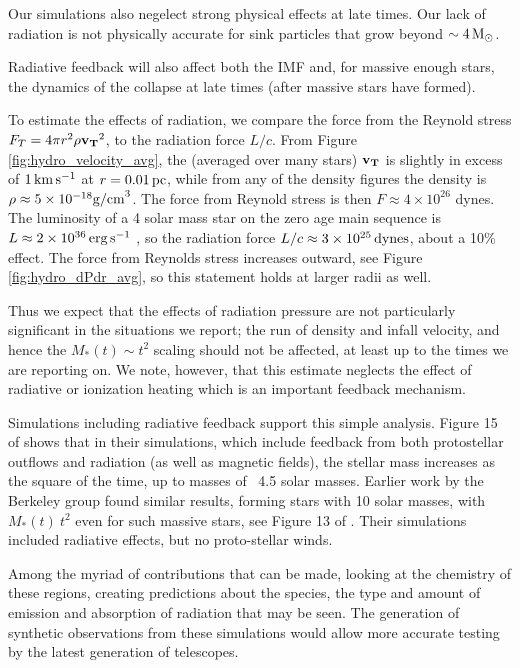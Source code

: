 \documentclass[../dissertation.tex]{subfiles}
\begin{document}
Our simulations also negelect strong physical effects at late times. 
Our lack of radiation is not physically accurate for sink particles that grow beyond $\sim 4 {\,\rm M}_\odot$.

Radiative feedback will also affect both the IMF and, for massive enough stars, the dynamics of the collapse at late times (after massive stars have formed). 

To estimate the effects of radiation, we compare the force from the Reynold stress $F_T=4\pi r^2 \rho \mathbf{v_T}^2$, to the radiation force $L/c$. 
From Figure \ref{fig:hydro_velocity_avg}, the (averaged over many stars) $\mathbf{v_T}$ is slightly in excess of $1\,\rm km\,s^{-1}$ at $r=0.01\,\rm pc$, 
while from any of the density figures the density is $\rho\approx5\times10^{-18} {\rm g/cm}^3$. 
The force from Reynold stress is then $F\approx4\times 10^{26}$ dynes. 
The luminosity of a 4 solar mass star on the zero age main sequence is $L\approx 2\times10^{36}\,\rm erg\, s^{-1}$ \citep{1992A&AS...96..269S}, 
so the radiation force $L/c \approx 3\times10^{25}\,{\rm dynes}$, about a 10\% effect. 
The force from Reynolds stress increases outward, see Figure \ref{fig:hydro_dPdr_avg}, so this statement holds at larger radii as well. 

Thus we expect that the effects of radiation pressure are not particularly significant in the situations we report; 
the run of density and infall velocity, and hence the $M_*(t)\sim t^2$ scaling should not be affected, at least up to the times we are reporting on. 
We note, however, that this estimate neglects the effect of radiative or ionization heating which is an important feedback mechanism.

Simulations including radiative feedback support this simple analysis. 
Figure 15 of  \citet{2014MNRAS.439.3420M} shows that in their simulations, 
which include feedback from both protostellar outflows and radiation (as well as magnetic fields), 
the stellar mass increases as the square of the time, up to masses of ~4.5 solar masses. 
Earlier work by the Berkeley group found similar results, forming stars with 10 solar masses, 
with $M_*(t)~ t^2$ even for such massive stars, see Figure 13 of \citet{2012ApJ...754...71K}. 
Their simulations included radiative effects, but no proto-stellar winds. 

Among the myriad of contributions that can be made, looking at the chemistry of these regions, 
creating predictions about the species, the type and amount of emission and absorption of radiation that may be seen. 
The generation of synthetic observations from these simulations would allow more accurate testing by the latest generation of telescopes.
\end{document}
